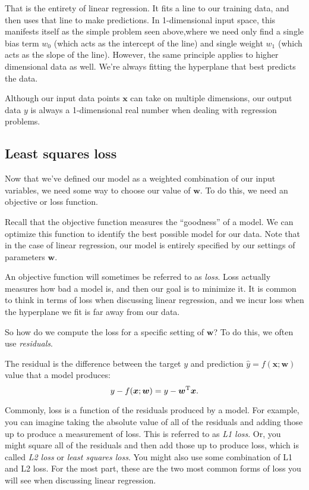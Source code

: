That is the entirety of linear regression. It fits a line to our training data, and then uses that line to make predictions. In 1-dimensional input space, this manifests itself as the simple problem seen above,where  we need only find a single bias term $w_0$ (which acts as the intercept of the line) and single weight $w_1$ (which acts as the slope of the line). However, the same principle applies to higher dimensional data as well. We're always fitting the hyperplane that best predicts the data.

\begin{warning}
    Although our input data points $\bm x$ can take on multiple dimensions, our output data $y$ is always a 1-dimensional real number when dealing with regression problems.
\end{warning}


\subsection{Least squares loss}
Now that we've defined our model as a weighted combination of our input variables, we need some way to choose our value of $\bm w$. To do this, we need an objective or loss function.

Recall that the objective function measures the ``goodness'' of a model. We can optimize this function to identify the best possible model for our data. Note that in the case of linear regression, our model is entirely specified by our settings of parameters $\bm w$.

An objective function will sometimes be referred to as \textit{loss}. Loss actually measures how bad a model is, and then our goal is to minimize it. It is common to think in terms of loss when discussing linear regression, and we incur loss when the hyperplane we fit is far away from our data.

So how do we compute the loss for a specific setting of $\bm w$? To do this, we often use \emph{residuals}.

\begin{definition}[residual]
    The residual is the difference between the target $y$ and prediction $\hat y = f(\bm x; \bm w)$ value that a model produces: $$y - f(\bm x; \bm w) = y - \bm w^{\mathrm T} \bm x.$$
\end{definition}

Commonly, loss is a function of the residuals produced by a model. For example, you can imagine taking the absolute value of all of the residuals and adding those up to produce a measurement of loss. This is referred to as \textit{L1 loss}. Or, you might square all of the residuals and then add those up to produce loss, which is called \textit{L2 loss} or \textit{least squares loss}. You might also use some combination of L1 and L2 loss. For the most part, these are the two most common forms of loss you will see when discussing linear regression.

